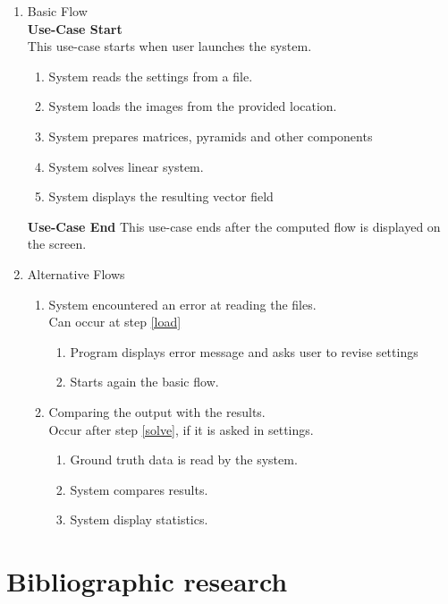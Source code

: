 \documentclass[12pt,a4paper,twoside]{report}
\begin{document}
\begin{enumerate}
	
	\item Basic Flow \\ 		\textbf{Use-Case Start} \\
	This use-case starts when user launches the system.
	\begin{enumerate}
		\item System reads the settings from a file.
		\item System loads the images from the provided location. \label{load}
		\item System prepares matrices, pyramids and other components
		\item System solves linear system. \label{solve}
		\item System displays the resulting vector field
	\end{enumerate}
	\textbf{Use-Case End}
	This use-case ends after the computed flow is displayed on the screen.
	\item Alternative Flows
	\begin{enumerate}
		\item System encountered an error at reading the files. \\ Can occur at step \ref{load}	
			\begin{enumerate}
				\item Program displays error message and asks user to revise settings
				\item Starts again the basic flow.
			\end{enumerate}
		\item Comparing the output with the results.  \\Occur after step \ref{solve}, if it is asked in settings.
			\begin{enumerate}
				\item Ground truth data is read by the system.
				\item System compares results.
				\item System display statistics.
			\end{enumerate}
	\end{enumerate}
\end{enumerate}


\chapter{Bibliographic research}
\end{document}
